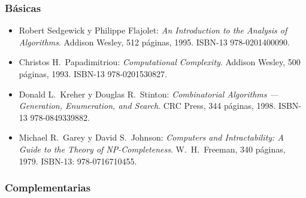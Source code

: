 \documentclass[10 pt]{article}
\begin{document}
\subsubsection{B\'{a}sicas}

 \begin{itemize}[itemsep=0em]

 \item Robert {\sc Sedgewick} y Philippe {\sc Flajolet}: {\em An                                                                                                          
     Introduction to the Analysis of Algorithms}. Addison Wesley, 512
   p\'{a}ginas, 1995. ISBN-13 978-0201400090.

 \item Christos H.\ {\sc Papadimitriou}: {\em Computational                                                                                                               
     Complexity}. Addison Wesley, 500 p\'{a}ginas, 1993. ISBN-13
   978-0201530827.

 \item Donald L.\ {\sc Kreher} y Douglas R.\ {\sc Stinton}: {\em                                                                                                          
     Combinatorial Algorithms --- Generation, Enumeration, and                                                                                                            
     Search}. CRC Press, 344 p\'{a}ginas, 1998. ISBN-13 978-0849339882.


 \item Michael R.\ {\sc Garey} y David S.\ {\sc Johnson}: {\em                                                                                                            
     Computers and Intractability: A Guide to the Theory of                                                                                                               
     NP-Completeness}. W.\ H.\ Freeman, 340 p\'{a}ginas, 1979. ISBN-13:
   978-0716710455.   
\end{itemize}

\subsubsection{Complementarias}
\end{document}
